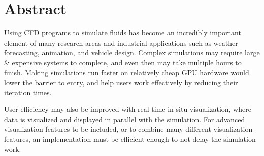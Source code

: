 
\section*{Abstract}
\vspace{1.5cm}

\large

Using CFD programs to simulate fluids has become an incredibly important element of many research areas and industrial applications such as weather forecasting, animation, and vehicle design.
Complex simulations may require large \& expensive systems to complete, and even then may take multiple hours to finish.
Making simulations run faster on relatively cheap GPU hardware would lower the barrier to entry, and help users work effectively by reducing their iteration times.

User efficiency may also be improved with real-time in-situ visualization, where data is visualized and displayed in parallel with the simulation.
For advanced visualization features to be included, or to combine many different visualization features, an implementation must be efficient enough to not delay the simulation work.

